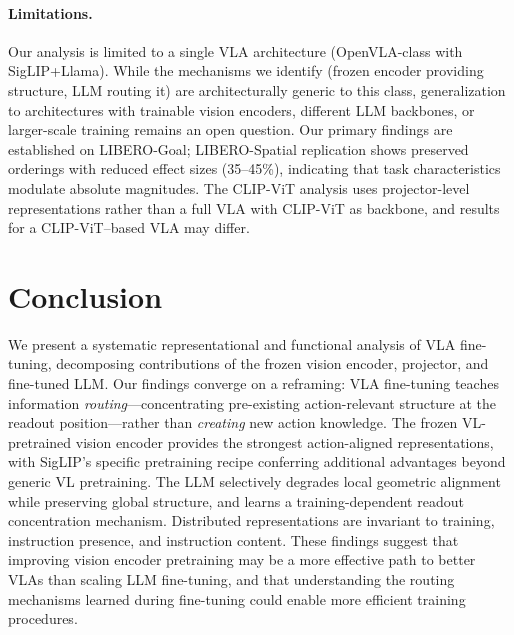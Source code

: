 \documentclass[letterpaper]{article}
\begin{document}
\paragraph{Limitations.}
Our analysis is limited to a single VLA architecture (OpenVLA-class with SigLIP+Llama).
While the mechanisms we identify (frozen encoder providing structure, LLM routing it) are architecturally generic to this class, generalization to architectures with trainable vision encoders, different LLM backbones, or larger-scale training remains an open question.
Our primary findings are established on LIBERO-Goal; LIBERO-Spatial replication shows preserved orderings with reduced effect sizes (35--45\%), indicating that task characteristics modulate absolute magnitudes.
The CLIP-ViT analysis uses projector-level representations rather than a full VLA with CLIP-ViT as backbone, and results for a CLIP-ViT--based VLA may differ.

\section{Conclusion}

We present a systematic representational and functional analysis of VLA fine-tuning, decomposing contributions of the frozen vision encoder, projector, and fine-tuned LLM.
Our findings converge on a reframing: VLA fine-tuning teaches information \emph{routing}---concentrating pre-existing action-relevant structure at the readout position---rather than \emph{creating} new action knowledge.
The frozen VL-pretrained vision encoder provides the strongest action-aligned representations, with SigLIP's specific pretraining recipe conferring additional advantages beyond generic VL pretraining.
The LLM selectively degrades local geometric alignment while preserving global structure, and learns a training-dependent readout concentration mechanism.
Distributed representations are invariant to training, instruction presence, and instruction content.
These findings suggest that improving vision encoder pretraining may be a more effective path to better VLAs than scaling LLM fine-tuning, and that understanding the routing mechanisms learned during fine-tuning could enable more efficient training procedures.
\end{document}
